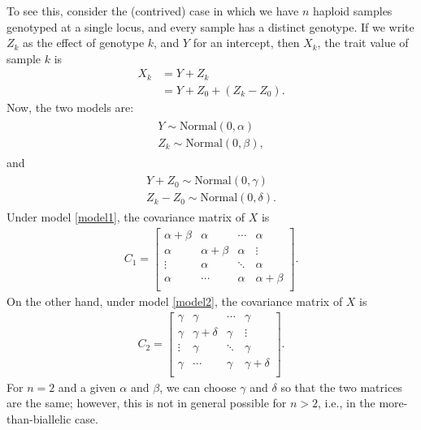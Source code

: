 To see this, consider the (contrived) case in which we have $n$ haploid samples
genotyped at a single locus, and every sample has a distinct genotype.
If we write $Z_k$ as the effect of genotype $k$,
and $Y$ for an intercept,
then $X_k$, the trait value of sample $k$ is 
\begin{align*}
    X_k &= Y + Z_k \\
        &= Y + Z_0 + (Z_k - Z_0) .
\end{align*}
Now, the two models are:
\begin{align} \label{model1}
\begin{gathered}
    Y \sim \text{Normal}(0, \alpha) \\
    Z_k \sim \text{Normal}(0, \beta) ,
\end{gathered}
\end{align}
and
\begin{align} \label{model2}
\begin{gathered}
    Y + Z_0  \sim \text{Normal}(0, \gamma) \\
    Z_k - Z_0 \sim \text{Normal}(0, \delta) .
\end{gathered}
\end{align}
Under model \eqref{model1},
the covariance matrix of $X$ is
\begin{align*}
C_1 = \left[ \begin{array}{cccc}
    \alpha + \beta & \alpha         & \cdots &  \alpha\\
    \alpha         & \alpha + \beta & \alpha & \vdots \\
    \vdots         &   \alpha       &   \ddots     & \alpha \\
      \alpha       &       \cdots   & \alpha &  \alpha + \beta \\
\end{array} \right] .
\end{align*}
On the other hand, under model \eqref{model2},
the covariance matrix of $X$ is
\begin{align*}
C_2 = \left[ \begin{array}{cccc}
    \gamma         & \gamma         & \cdots &  \gamma \\
    \gamma         & \gamma + \delta & \gamma & \vdots \\
    \vdots         &      \gamma     &   \ddots     & \gamma \\
    \gamma         &       \cdots   & \gamma &  \gamma + \delta \\
\end{array} \right] .
\end{align*}
For $n=2$ and a given $\alpha$ and $\beta$, we can choose $\gamma$ and $\delta$ so that the two matrices are the same;
however, this is not in general possible for $n > 2$,
i.e., in the more-than-biallelic case.

